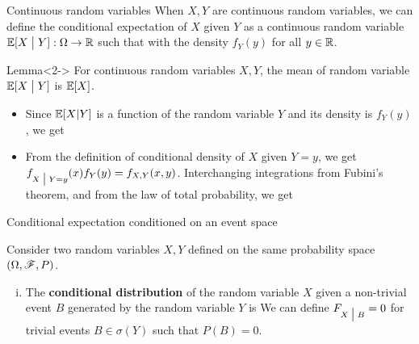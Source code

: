 \documentclass[12pt,aspectratio=169]{beamer}
\begin{document}
\begin{frame}{Continuous random variables} 
When $X, Y$ are continuous random variables, we can define the conditional expectation of $X$ given $Y$ as a continuous random variable $\mathbb{E}[X\; \big\vert \; Y]: \Omega \to \mathbb{R}$ such that 
with the density $f_Y(y)$ for all $y \in \mathbb{R}$.  
\begin{block}{Lemma}<2->
For continuous random variables $X, Y$, 
the mean of random variable $\mathbb{E}[X \; \big\vert \; Y]$ is $\mathbb{E}[X]$. 
\end{block}
\end{frame}
\begin{frame}
\begin{Proof}
\begin{itemize}
\item <1-> Since $\mathbb{E}[X|Y]$ is a function of the random variable $Y$ and its density is $f_Y(y)$, we get 
\item <2-> From the definition of conditional density of $X$ given $Y =y$, we get $f_{X \; \big\vert \; Y = y}(x)f_Y(y) = f_{X,Y}(x,y)$. 
Interchanging integrations from Fubini's theorem, and from the law of total probability, we get 
\end{itemize}
\end{Proof}
\end{frame}


\begin{frame}{Conditional expectation conditioned on an event space}
\begin{Definition}
Consider two random variables $X,Y$ defined on the same probability space $(\Omega, \mathscr{F}, P)$. 
\begin{enumerate}[(i)]
\item The \textbf{conditional distribution} of the random variable $X$ given a non-trivial event $B$ generated by the random variable $Y$ is 
We can define $F_{X\; \big\vert \; B} = 0$ for trivial events $B \in \sigma(Y)$ such that $P(B) = 0$. 
\end{enumerate}
\end{Definition}
\end{frame}
\end{document}
